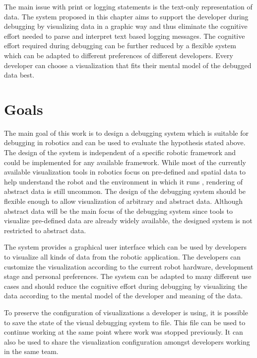The main issue with print or logging statements is the text-only representation of data. The system proposed in this chapter aims to support the developer during debugging by visualizing data in a graphic way and thus eliminate the cognitive effort needed to parse and interpret text based logging messages. The cognitive effort required during debugging can be further reduced by a flexible system which can be adapted to different preferences of different developers. Every developer can choose a visualization that fits their mental model of the debugged data best.


\section{Goals}
The main goal of this work is to design a debugging system which is suitable for debugging in robotics and can be used to evaluate the hypothesis stated above. The design of the system is independent of a specific robotic framework and could be implemented for any available framework.
While most of the currently available visualization tools in robotics focus on pre-defined and spatial data to help understand the robot and the environment in which it runs \cite{Collett2010, Quigley2009}, rendering of abstract data is still uncommon. The design of the debugging system should be flexible enough to allow visualization of arbitrary and abstract data. Although abstract data will be the main focus of the debugging system since tools to visualize pre-defined data are already widely available, the designed system is not restricted to abstract data.

The system provides a graphical user interface which can be used by developers to visualize all kinds of data from the robotic application. The developers can customize the visualization according to the current robot hardware, development stage and personal preferences. The system can be adapted to many different use cases and should reduce the cognitive effort during debugging by visualizing the data according to the mental model of the developer and meaning of the data.

To preserve the configuration of visualizations a developer is using, it is possible to save the state of the visual debugging system to file. This file can be used to continue working at the same point where work was stopped previously. It can also be used to share the visualization configuration amongst developers working in the same team.

